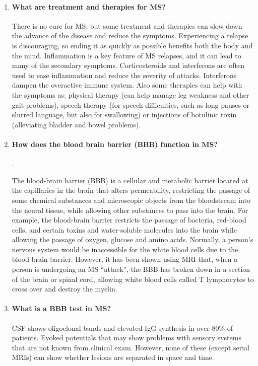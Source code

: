 \documentclass[12pt,article,oneside,a4paper]{memoir}
\begin{document}
\begin{enumerate}
\item \paragraph{What are treatment and therapies for MS?}
There is no cure for MS, but some treatment and therapies can slow down the
advance of the disease and reduce the symptoms.
Experiencing a relapse is discouraging, so ending it as quickly as possible
benefits both the body and the mind. Inflammation is a key feature of MS
relapses, and it can lead to many of the secondary symptoms. Corticosteroids
and interferons are often used to ease inflammation and reduce the severity of
attacks. Interferons dampen the overactive immune system. Also some therapies
can help with the symptoms as: physical therapy (can help manage leg weakness
and other gait problems), speech therapy (for speech difficulties, such as long
pauses or slurred language, but also for swallowing) or injections of botulinic
toxin (alleviating bladder and bowel problems).

\item \paragraph{How does the blood brain barrier (BBB) function in MS?}.

The blood-brain barrier (BBB) is a cellular and metabolic barrier located at
the capillaries in the brain that alters permeability, restricting the passage
of some chemical substances and microscopic objects from the bloodstream into
the neural tissue, while allowing other substances to pass into the brain. For
example, the blood-brain barrier restricts the passage of bacteria, red-blood
cells, and certain toxins and water-soluble molecules into the brain while
allowing the passage of oxygen, glucose and amino acids. Normally, a person's
nervous system would be inaccessible for the white blood cells due to the
blood-brain barrier. However, it has been shown using MRI that, when a person
is undergoing an MS ``attack'', the BBB has broken down in a section of the
brain or spinal cord, allowing white blood cells called T lymphocytes to cross
over and destroy the myelin. 

\item \paragraph{What is a BBB test in MS?}
CSF shows oligoclonal bands and elevated IgG synthesis in over 80\% of patients.
Evoked potentials that may show problems with sensory systems that are not
known from clinical exam. However, none of these (except serial MRIs) can show
whether lesions are separated in space and time.


\end{enumerate}
\end{document}
